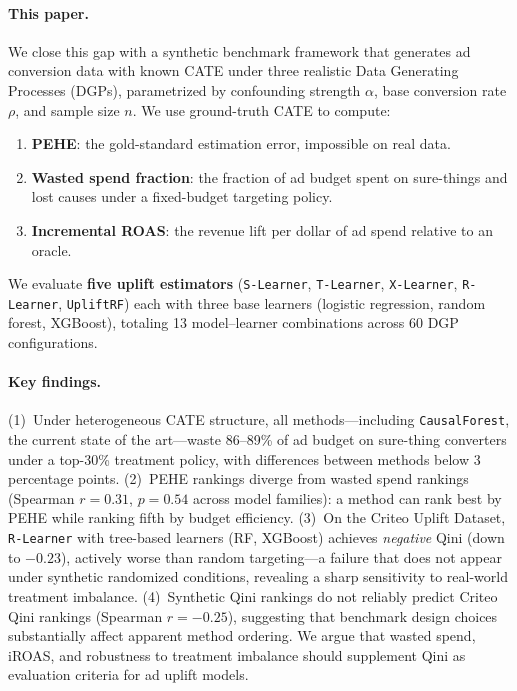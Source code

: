 \documentclass[10pt]{article}
\newcommand{\slearner}{\texttt{S-Learner}\xspace}
\newcommand{\tlearner}{\texttt{T-Learner}\xspace}
\newcommand{\xlearner}{\texttt{X-Learner}\xspace}
\newcommand{\rlearner}{\texttt{R-Learner}\xspace}
\newcommand{\upliftrf}{\texttt{UpliftRF}\xspace}
\newcommand{\causalforest}{\texttt{CausalForest}\xspace}
\begin{document}
\paragraph{This paper.}
We close this gap with a synthetic benchmark framework that generates ad
conversion data with known CATE under three realistic Data Generating Processes
(DGPs), parametrized by confounding strength $\alpha$, base conversion rate
$\rho$, and sample size $n$. We use ground-truth CATE to compute:
%
\begin{enumerate}[topsep=2pt,itemsep=1pt]
  \item \textbf{PEHE}: the gold-standard estimation error, impossible on real data.
  \item \textbf{Wasted spend fraction}: the fraction of ad budget spent on
    sure-things and lost causes under a fixed-budget targeting policy.
  \item \textbf{Incremental ROAS}: the revenue lift per dollar of ad spend
    relative to an oracle.
\end{enumerate}
%
We evaluate \textbf{five uplift estimators} (\slearner, \tlearner, \xlearner,
\rlearner, \upliftrf) each with three base learners (logistic regression,
random forest, XGBoost), totaling 13 model--learner combinations across 60
DGP configurations.

\paragraph{Key findings.}
(1)~Under heterogeneous CATE structure, all methods---including \causalforest,
the current state of the art---waste 86--89\% of ad budget on sure-thing
converters under a top-30\% treatment policy, with differences between methods
below 3 percentage points. (2)~PEHE rankings diverge from wasted spend
rankings (Spearman $r=0.31$, $p=0.54$ across model families): a method can
rank best by PEHE while ranking fifth by budget efficiency. (3)~On the Criteo
Uplift Dataset, \rlearner with tree-based learners (RF, XGBoost) achieves
\emph{negative} Qini (down to $-0.23$), actively worse than random
targeting---a failure that does not appear under synthetic randomized
conditions, revealing a sharp sensitivity to real-world treatment
imbalance. (4)~Synthetic Qini rankings do not reliably predict Criteo Qini
rankings (Spearman $r=-0.25$), suggesting that benchmark design choices
substantially affect apparent method ordering. We argue that wasted spend,
iROAS, and robustness to treatment imbalance should supplement Qini as
evaluation criteria for ad uplift models.
\end{document}
